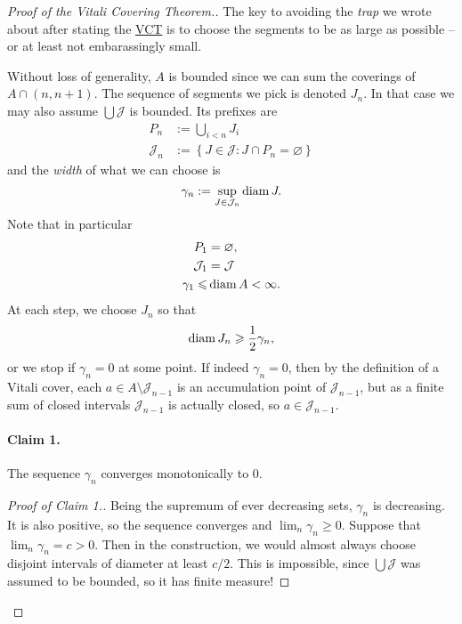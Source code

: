 \begin{proof}[Proof of the Vitali Covering Theorem.]
    The key to avoiding the \emph{trap} we wrote about after stating the \hyperlink{VitaliCoveringTheorem}{VCT} is to choose the segments to be as large as possible -- or at least not embarassingly small.

    Without loss of generality, \( A \) is bounded since we can sum the coverings of \( A \cap (n,n+1) \). The sequence of segments we pick is denoted \( J_n \). In that case we may also assume \( \bigcup \mathcal{J} \) is bounded. Its prefixes are
    \begin{align*}
        P_n &:= \bigcup_{i < n} J_i \\
        \mathcal{J}_n &:= \left\{ J \in \mathcal{J} : J \cap P_n = \varnothing \right\}
    \end{align*}
   and the \emph{width} of what we can choose is
    \[ 
        \gamma_n := \sup_{J \in \mathcal{J}_n} \operatorname{diam} J.
    \]
    Note that in particular
    \begin{align*}
        P_1 &= \varnothing, \\
        \mathcal{J}_1 &= \mathcal{J} \\
        \gamma_1 \leqslant &\operatorname{diam} A < \infty.
    \end{align*}
    At each step, we choose \( J_n \) so that
    \[ 
       \operatorname{diam} J_n \geqslant \frac{1}{2}\gamma_n,
   \]
   or we stop if \( \gamma_n = 0 \) at some point. If indeed \( \gamma_n = 0 \), then by the definition of a Vitali cover, each \( a \in A \setminus \mathcal{J}_{n-1} \) is an accumulation point of \( \mathcal{J}_{n-1} \), but as a finite sum of closed intervals \( \mathcal{J}_{n-1} \) is actually closed, so \( a \in \mathcal{J}_{n-1} \).
\paragraph{Claim 1.} The sequence \( \gamma_n \) converges monotonically to \( 0 \).
\begin{proof}[Proof of Claim 1.] Being the supremum of ever decreasing sets, \( \gamma_n \) is decreasing. It is also positive, so the sequence converges and \( \lim_n \gamma_n \geqslant 0 \). Suppose that \( \lim_n \gamma_n = c > 0 \). Then in the construction, we would almost always choose disjoint intervals of diameter at least \( c/2 \). This is impossible, since \( \bigcup \mathcal{J} \) was assumed to be bounded, so it has finite measure!
\end{proof}


\end{proof}
